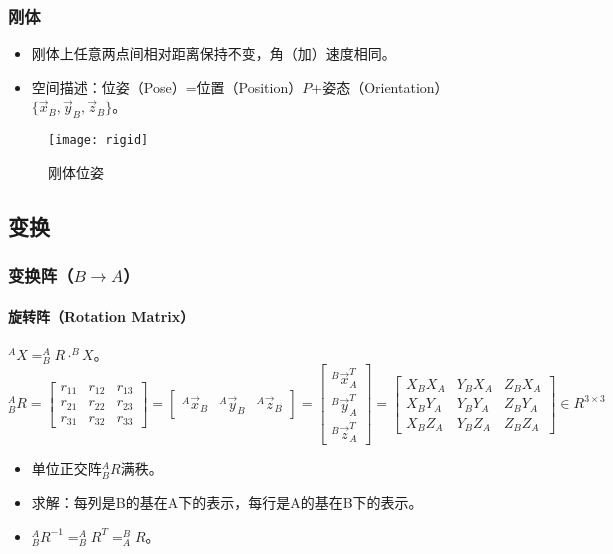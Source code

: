 \documentclass[
12pt, %
a4paper, 
oneside, %
headinclude,footinclude, %
]{scrartcl}
\begin{document}
\subsubsection{刚体}
\begin{itemize}
\item 刚体上任意两点间相对距离保持不变，角（加）速度相同。
\item 空间描述：位姿（Pose）=位置（Position）$ P $+姿态（Orientation）$ \{\vec x_B, \vec y_B, \vec z_B\} $。
\end{itemize}

\begin{figure}[H]
\centering 
\texttt{[image: rigid]} 
\caption[刚体位姿]{刚体位姿}
\end{figure}
\subsection{变换}
\subsubsection{变换阵（$ B \to A $）}
\paragraph{旋转阵（Rotation Matrix）}
$ ^A X = ^A_B R \cdot ^B X $。
$$ 
^A_B R 
= \begin{bmatrix} r_{11} & r_{12} & r_{13} \\ r_{21} & r_{22} & r_{23} \\ r_{31} & r_{32} & r_{33} \end{bmatrix}
= \begin{bmatrix} ^A \vec x_B & ^A \vec y_B & ^A \vec z_B \end{bmatrix}
= \begin{bmatrix} ^B \vec x_A^T \\ ^B \vec y_A^T \\ ^B \vec z_A^T \end{bmatrix}
= \begin{bmatrix} X_BX_A & Y_BX_A & Z_BX_A \\ X_BY_A & Y_BY_A & Z_BY_A \\ X_BZ_A & Y_BZ_A & Z_BZ_A \end{bmatrix}
\in R^{3 \times 3}
$$
\begin{itemize}
\item 单位正交阵$ ^A_B R $满秩。
\item 求解：每列是B的基在A下的表示，每行是A的基在B下的表示。
\item $ ^A_B R^{-1} = ^A_B R^T = ^B_A R $。
\end{itemize}
\end{document}
